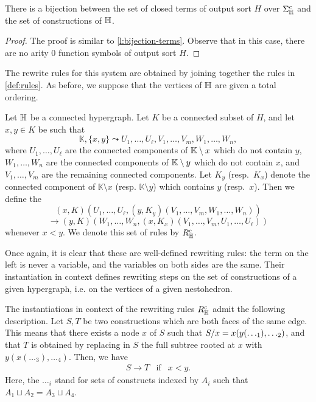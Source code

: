 \begin{lemma} 
  There is a bijection between the set of closed terms of output sort $H$ over $\Sigma_{\mathbb H}^c$ and the set of constructions of ${\mathbb H}$.
\end{lemma}

\begin{proof}
  The proof is similar to \cref{l:bijection-terms}.
  Observe that in this case, there are no arity $0$ function symbols of output sort $H$. 
\end{proof}

The rewrite rules for this system are obtained by joining together the rules in \cref{def:rules}. 
As before, we suppose that the vertices of ${\mathbb H}$ are given a total ordering.

\begin{definition} \label{def:rules-2}
  Let ${\mathbb H}$ be a connected hypergraph. 
  Let $K$ be a connected subset of $H$, and let $x,y \in K$ be such that
  $$\mathbb{K},\{x,y\} \leadsto U_1,\ldots,U_\ell,V_1,\ldots,V_m,W_1,\ldots,W_n,$$
  where $U_1,\ldots,U_\ell$ are the connected components of ${\mathbb K} \setminus x$ which do not contain $y$, $W_1,\ldots,W_n$ are the connected components of ${\mathbb K} \setminus y$ which do not contain $x$, and $V_1,\ldots,V_m$ are the remaining connected components. 
  Let $K_y$ (resp.\ $K_x$) denote the connected component of $\mathbb{K} \setminus x$ (resp. $\mathbb{K} \setminus y$) which contains $y$ (resp.\ $x$).
  Then we define the 
  $$(x,K)(U_1,\ldots, U_{\ell},(y,K_y)(V_1,\ldots,V_m,W_1,\ldots,W_n))$$
  $$ \longrightarrow (y,K)(W_1,\ldots,W_n,(x,K_x)(V_1,\ldots,V_m,U_1,\ldots,U_\ell))$$
  whenever $x < y$. 
  We denote this set of rules by $R_{\mathbb H}^c$.
\end{definition} 

Once again, it is clear that these are well-defined rewriting rules: the term on the left is never a variable, and the variables on both sides are the same.
Their instantiation in context defines rewriting steps on the set of constructions of a given hypergraph, i.e. on the vertices of a given nestohedron.

\begin{lemma} 
  The instantiations in context of the rewriting rules $R_{\mathbb H}^c$ admit the following description.
  Let $S,T$ be two constructions which are both faces of the same edge. 
  This means that there exists a node $x$ of $S$ such that $S/x=x(y(\ldots_1),\ldots_2)$, and that $T$ is obtained by replacing in $S$ the full subtree rooted at $x$ with $y(x(\ldots_3),\ldots_4)$. 
  Then, we have
  $$\begin{array}{lll}
    S \to T &  \mathrm{if} & x < y. 
  \end{array}$$
  Here, the $\ldots_i$ stand for sets of constructs indexed by $A_i$ such that $A_1\sqcup A_2 = A_3\sqcup A_4$.
\end{lemma} 

